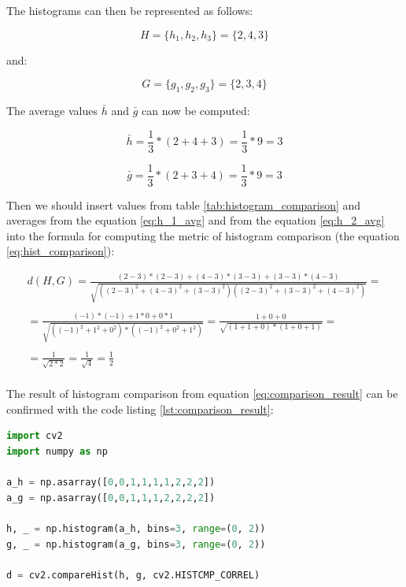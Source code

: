 The histograms can then be represented as follows:

\begin{equation*}
	H = \{h_1, h_2, h_3\} = \{2, 4, 3\}
\end{equation*}

and:

\begin{equation*}
	G = \{g_1, g_2, g_3\} = \{2, 3, 4\}
\end{equation*}

The average values $\bar{h}$ and $\bar{g}$ can now be computed:

\begin{equation}
	\bar{h} = \frac{1}{3} * (2 + 4 + 3) = \frac{1}{3} * 9 = 3
	\label{eq:h_1_avg}
\end{equation}

\begin{equation}
	\bar{g} = \frac{1}{3} * (2 + 3 + 4) = \frac{1}{3} * 9 = 3
	\label{eq:h_2_avg}
\end{equation}

Then we should insert values from table \ref{tab:histogram_comparison} and averages from the equation \ref{eq:h_1_avg} and from the equation \ref{eq:h_2_avg} into the formula for computing the metric of histogram comparison (the equation \ref{eq:hist_comparison}):

\begin{equation}
\begin{aligned}
	d(H, G) = \frac{(2-3)*(2-3) + (4-3)*(3-3) + (3-3)*(4-3)}{\sqrt{((2-3)^2 + (4-3)^2 + (3-3)^2)((2-3)^2 + (3-3)^2 + (4-3)^2)}} = \\ \\ 
	= \frac{(-1) * (-1) + 1 * 0 + 0 * 1}{\sqrt{((-1)^2 + 1^2 + 0^2) * ((-1)^2 + 0^2 + 1^2)}} 
	= \frac{1 + 0 + 0}{\sqrt{(1+1+0)*(1+0+1)}} = \\ \\
	= \frac{1}{\sqrt{2 * 2}} = \frac{1}{\sqrt{4}} = \frac{1}{2}
	\label{eq:comparison_result}
\end{aligned}
\end{equation}

\paragraph{}
The result of histogram comparison from equation \ref{eq:comparison_result} can be confirmed with the code listing \ref{lst:comparison_result}:

\begin{lstlisting}[language=Python, caption=Histogram comparison in Python, label={lst:comparison_result},basicstyle={\ttfamily}]
import cv2
import numpy as np

a_h = np.asarray([0,0,1,1,1,1,2,2,2])
a_g = np.asarray([0,0,1,1,1,2,2,2,2])

h, _ = np.histogram(a_h, bins=3, range=(0, 2))
g, _ = np.histogram(a_g, bins=3, range=(0, 2))

d = cv2.compareHist(h, g, cv2.HISTCMP_CORREL)
\end{lstlisting}

